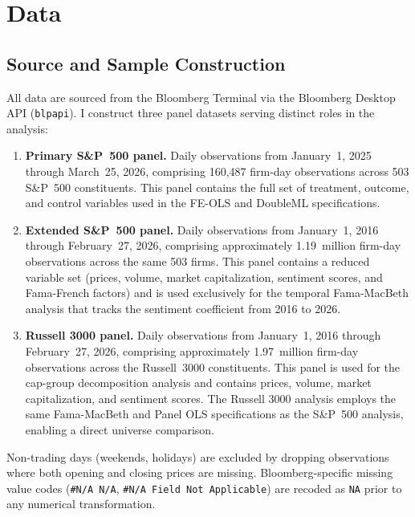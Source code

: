 \section{Data}\label{data}

\subsection{Source and Sample
Construction}\label{source-and-sample-construction}

All data are sourced from the Bloomberg Terminal via the Bloomberg
Desktop API (\texttt{blpapi}). I construct three panel datasets serving
distinct roles in the analysis:

\begin{enumerate}
\def\labelenumi{\arabic{enumi}.}
\item
  \textbf{Primary S\&P~500 panel.} Daily observations from January~1,
  2025 through March~25, 2026, comprising 160,487 firm-day observations
  across 503 S\&P~500 constituents. This panel contains the full set of
  treatment, outcome, and control variables used in the FE-OLS and
  DoubleML specifications.
\item
  \textbf{Extended S\&P~500 panel.} Daily observations from January~1,
  2016 through February~27, 2026, comprising approximately 1.19~million
  firm-day observations across the same 503 firms. This panel contains a
  reduced variable set (prices, volume, market capitalization, sentiment
  scores, and Fama-French factors) and is used exclusively for the
  temporal Fama-MacBeth analysis that tracks the sentiment coefficient
  from 2016 to 2026.
\item
  \textbf{Russell 3000 panel.} Daily observations from January~1, 2016
  through February~27, 2026, comprising approximately 1.97~million
  firm-day observations across the Russell~3000 constituents. This panel
  is used for the cap-group decomposition analysis and contains prices,
  volume, market capitalization, and sentiment scores. The Russell 3000
  analysis employs the same Fama-MacBeth and Panel OLS specifications as
  the S\&P~500 analysis, enabling a direct universe comparison.
\end{enumerate}

Non-trading days (weekends, holidays) are excluded by dropping
observations where both opening and closing prices are missing.
Bloomberg-specific missing value codes (\texttt{\#N/A\ N/A},
\texttt{\#N/A\ Field\ Not\ Applicable}) are recoded as \texttt{NA} prior
to any numerical transformation.

